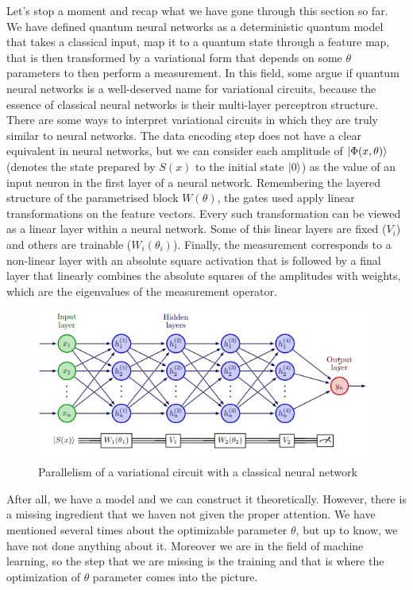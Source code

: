 Let's stop a moment and recap what we have gone through this section so far. We have defined quantum neural networks as a deterministic quantum model that takes a classical input, map it to a quantum state through a feature map, that is then transformed by a variational form that depends on some $\theta$ parameters to then perform a measurement. In this field, some argue if quantum neural networks is a well-deserved name for variational circuits, because the essence of classical neural networks is their multi-layer perceptron structure. There are some ways to interpret variational circuits in which they are truly similar to neural networks. The data encoding step does not have a clear equivalent in neural networks, but we can consider each amplitude of  $\ket{\Phi(x, \theta)}$ (denotes the state prepared by $S(x)$ to the initial state $\ket{0}$) as the value of an input neuron in the first layer of a neural network. Remembering the layered structure of the parametrised block $W(\theta)$, the gates used apply linear transformations on the feature vectors. Every such transformation can be viewed as a linear layer within a neural network. Some of this linear layers are fixed ($V_i$) and others are trainable ($W_i(\theta_i)$). Finally, the measurement corresponds to a non-linear layer with an absolute square activation that is followed by a final layer that linearly combines the absolute squares of the amplitudes with weights, which are the eigenvalues of the measurement operator.   

\begin{figure}
   \centering
   \includegraphics[width=\linewidth]{img/img-ch3/QNN_parallelism.png}
   \caption{Parallelism of a variational circuit with a classical neural network}
   \label{fig:QNN-parallelism}
\end{figure}

After all, we have a model and we can construct it theoretically. However, there is a missing ingredient that we haven not given the proper attention. We have mentioned several times about the optimizable parameter $\theta$, but up to know, we have not done anything about it. Moreover we are in the field of machine learning, so the step that we are missing is the training and that is where the optimization of $\theta$ parameter comes into the picture.


